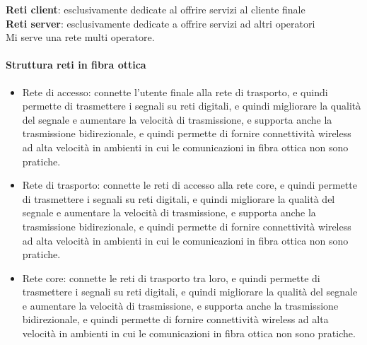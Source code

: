 \textbf{Reti client}: esclusivamente dedicate al offrire servizi al cliente finale\\

\textbf{Reti server}: esclusivamente dedicate a offrire servizi ad altri operatori\\

Mi serve una rete multi operatore.

\paragraph{Struttura reti in fibra ottica}
\begin{itemize}
    \item Rete di accesso: connette l'utente finale alla rete di trasporto, e quindi permette di trasmettere i segnali su reti digitali, e quindi migliorare la qualità del segnale e aumentare la velocità di trasmissione, e supporta anche la trasmissione bidirezionale, e quindi permette di fornire connettività wireless ad alta velocità in ambienti in cui le comunicazioni in fibra ottica non sono pratiche.\\
    \item Rete di trasporto: connette le reti di accesso alla rete core, e quindi permette di trasmettere i segnali su reti digitali, e quindi migliorare la qualità del segnale e aumentare la velocità di trasmissione, e supporta anche la trasmissione bidirezionale, e quindi permette di fornire connettività wireless ad alta velocità in ambienti in cui le comunicazioni in fibra ottica non sono pratiche.\\
    \item Rete core: connette le reti di trasporto tra loro, e quindi permette di trasmettere i segnali su reti digitali, e quindi migliorare la qualità del segnale e aumentare la velocità di trasmissione, e supporta anche la trasmissione bidirezionale, e quindi permette di fornire connettività wireless ad alta velocità in ambienti in cui le comunicazioni in fibra ottica non sono pratiche.\\
\end{itemize}


